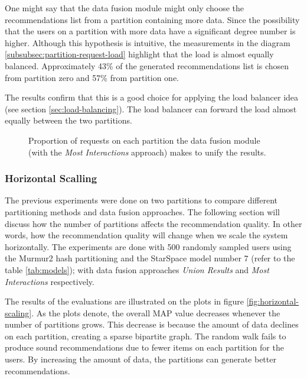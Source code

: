 One might say that the data fusion module might only choose the recommendations list from a partition containing more data. Since the possibility that the users on a partition with more data have a significant degree number is higher. Although this hypothesis is intuitive, the measurements in the diagram \ref{subsubsec:partition-request-load} highlight that the load is almost equally balanced. Approximately 43\% of the generated recommendations list is chosen from partition zero and 57\% from partition one.

The results confirm that this is a good choice for applying the load balancer idea (see section \ref{sec:load-balancing}). The load balancer can forward the load almost equally between the two partitions.

\begin{figure}[!htb]
    \centering
    
    \caption{Proportion of requests on each partition the data fusion module (with the \emph{Most Interactions} approach) makes to unify the results.}
    \label{plot:request-distribution}
\end{figure}


\subsubsection{Horizontal Scalling}
\label{subsubsec:eval-horizontal-scalling}
The previous experiments were done on two partitions to compare different partitioning methods and data fusion approaches. The following section will discuss how the number of partitions affects the recommendation quality. In other words, how the recommendation quality will change when we scale the system horizontally. The experiments are done with 500 randomly sampled users using the Murmur2 hash partitioning and the StarSpace model number 7 (refer to the table \ref{tab:models}); with data fusion approaches \emph{Union Results} and \emph{Most Interactions} respectively.


The results of the evaluations are illustrated on the plots in figure \ref{fig:horizontal-scaling}. As the plots denote, the overall MAP value decreases whenever the number of partitions grows. This decrease is because the amount of data declines on each partition, creating a sparse bipartite graph. The random walk fails to produce sound recommendations due to fewer items on each partition for the users. By increasing the amount of data, the partitions can generate better recommendations. 


